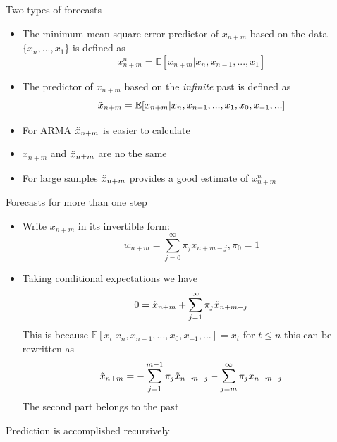 \documentclass{article}
\begin{document}
\vspace{1cm}
\noindent Two types of forecasts
\begin{itemize}
    \item The minimum mean square error predictor of $x_{n+m}$ based on the data $\{x_n, ..., x_1 \}$ is defined as
    \begin{equation*}
        x_{n+m}^n = \mathbb{E}[x_{n+m} | x_n , x_{n-1} , ..., x_1]
    \end{equation*}
    \item The predictor of $x_{n+m}$ based on the \textit{infinite} past is defined as
    \begin{equation*}
        \Tilde{x}_{n+m} = \mathbb{E}[x_{n+m}| x_n, x_{n-1},...,x_1,x_0,x_{-1},...]
    \end{equation*}
    \item For ARMA $\Tilde{x}_{n+m}$ is easier to calculate
    \item $x_{n+m}$ and $\Tilde{x}_{n+m}$ are no the same
    \item For large samples $\Tilde{x}_{n+m}$ provides a good estimate of $x_{n+m}^n$
\end{itemize}


\vspace{1cm}

\noindent Forecasts for more than one step
\begin{itemize}
    \item Write $x_{n+m}$ in its invertible form:
    \begin{equation*}
        w_{n+m} = \sum_{j=0}^\infty \pi_j x_{n+m-j} , \pi_0 =1
    \end{equation*}
    \item Taking conditional expectations we have
    \begin{equation*}
        0 = \Tilde{x}_{n+m} + \sum_{j=1}^\infty \pi_j \Tilde{x}_{n+m-j}
    \end{equation*}
    This is because $\mathbb{E}[x_t|x_n,x_{n-1},...,x_0,x_{-1},...] = x_t$ for $t \leq n$ this can be rewritten as
    \begin{equation*}
        \Tilde{x}_{n+m} = - \sum_{j=1}^{m-1} \pi_j \Tilde{x}_{n+m-j} - \sum_{j=m}^\infty \pi_j x_{n+m-j}
    \end{equation*}
    The second part belongs to the past
\end{itemize}

\vspace{1cm}

\noindent Prediction is accomplished recursively
\end{document}
